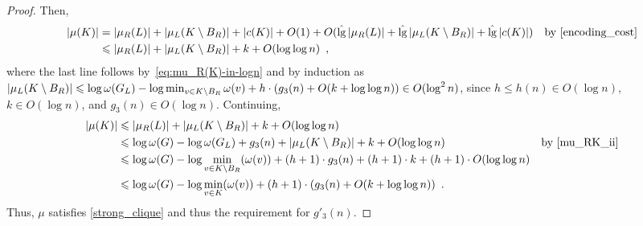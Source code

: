 \documentclass{patmorin}
\let\eqref\cref
\renewcommand{\le}{\leqslant}
\renewcommand{\leq}{\leqslant}
\DeclareMathOperator{\lgg}{\hat{lg}}
\newcommand{\Oh}{O}
\begin{document}
\begin{proof}
  Then,
  \begin{align*}
    |\mu(K)|
     & = |\mu_R(L)| + |\mu_{L}(K\setminus B_R)| + |c(K)| + \Oh(1)+\Oh(\lgg|\mu_R(L)|+\lgg|\mu_L(K\setminus B_R)|+\lgg|c(K)|)
     & \text{by \eqref{encoding_cost}}                                                                                       \\
     & \le |\mu_R(L)| + |\mu_{L}(K\setminus B_R)| + k + \Oh(\log\log n)\enspace,
  \end{align*}
  where the last line follows by~\eqref{eq:mu_R(K)-in-logn} and by induction as $|\mu_L(K\setminus B_R)|\leq \log\omega(G_L)-\linebreak \log\min_{v\in K\setminus B_R}\omega(v) + h\cdot(g_3(n)+\Oh(k+\log\log n)) \in\Oh(\log^2 n)$, since $h\le h(n)\in\Oh(\log n)$, $k\in\Oh(\log n)$, and $g_3(n)\in\Oh(\log n)$. Continuing,
  \begin{align*}
    |\mu(K)|
     & \le |\mu_R(L)| + |\mu_{L}(K\setminus B_R)| + k + \Oh(\log\log n)                                                             \\
     & \le \log\omega(G)-\log \omega(G_{L}) + g_3(n) + |\mu_{L}(K\setminus B_R)| + k + \Oh(\log\log n)
     & \text{by~\eqref{mu_RK_ii}}                                                                                                   \\
     & \le \log\omega(G) - \log\min_{v\in K\setminus B_R}(\omega(v)) + (h+1)\cdot g_3(n) + (h+1)\cdot k + (h+1)\cdot\Oh(\log\log n) \\
     & \le \log\omega(G) - \log\min_{v\in K}(\omega(v)) + (h+1)\cdot (g_3(n) + \Oh(k+\log\log n)) \enspace .
  \end{align*}
  Thus, $\mu$ satisfies \eqref{strong_clique} and thus the requirement for $g'_3(n)$.


\end{proof}
\end{document}
